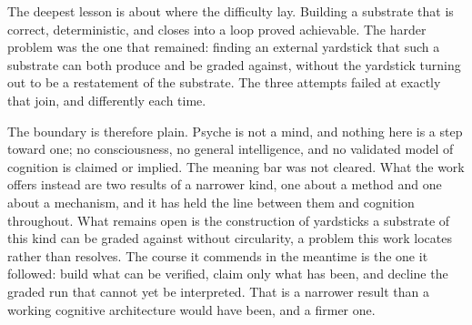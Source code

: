 \documentclass[conference]{IEEEtran}
\begin{document}
The deepest lesson is about where the difficulty lay. Building a substrate that is correct,
deterministic, and closes into a loop proved achievable. The harder problem was the one that
remained: finding an external yardstick that such a substrate can both produce and be graded
against, without the yardstick turning out to be a restatement of the substrate. The three
attempts failed at exactly that join, and differently each time.

The boundary is therefore plain. Psyche is not a mind, and nothing here is a step toward one;
no consciousness, no general intelligence, and no validated model of cognition is claimed or
implied. The meaning bar was not cleared. What the work offers instead are two results of a
narrower kind, one about a method and one about a mechanism, and it has held the line between
them and cognition throughout. What remains open is the construction of yardsticks a substrate
of this kind can be graded against without circularity, a problem this work locates rather than
resolves. The course it commends in the meantime is the one it followed: build what can be
verified, claim only what has been, and decline the graded run that cannot yet be interpreted.
That is a narrower result than a working cognitive architecture would have been, and a firmer
one.




\end{document}
